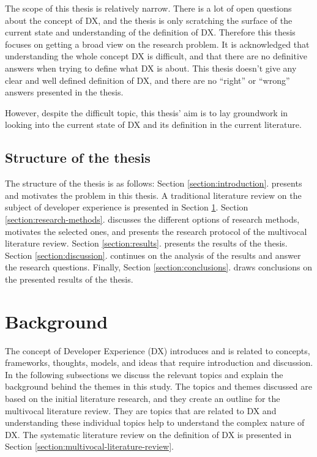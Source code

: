 \documentclass[english, 12pt, a4paper, sci, utf8, a-1b, online]{aaltothesis}
\begin{document}
The scope of this thesis is relatively narrow. There is a lot of open questions about the concept of DX, and the thesis is only scratching the surface of the current state and understanding of the definition of DX. Therefore this thesis focuses on getting a broad view on the research problem. It is acknowledged that understanding the whole concept DX is difficult, and that there are no definitive answers when trying to define what DX is about. This thesis doesn't give any clear and well defined definition of DX, and there are no ``right'' or ``wrong'' answers presented in the thesis.

However, despite the difficult topic, this thesis' aim is to lay groundwork in looking into the current state of DX and its definition in the current literature.

\subsection{Structure of the thesis}

The structure of the thesis is as follows: Section \ref{section:introduction}. presents and motivates the problem in this thesis. A traditional literature review on the subject of developer experience is presented in Section \ref{section:background}. Section \ref{section:research-methods}. discusses the different options of research methods, motivates the selected ones, and presents the research protocol of the multivocal literature review. Section \ref{section:results}. presents the results of the thesis. Section \ref{section:discussion}. continues on the analysis of the results and answer the research questions. Finally, Section \ref{section:conclusions}. draws conclusions on the presented results of the thesis.

\clearpage
\section{Background} \label{section:background}

The concept of Developer Experience (DX) introduces and is related to concepts, frameworks, thoughts, models, and ideas that require introduction and discussion. In the following subsections we discuss the relevant topics and explain the background behind the themes in this study. The topics and themes discussed are based on the initial literature research, and they create an outline for the multivocal literature review. They are topics that are related to DX and understanding these individual topics help to understand the complex nature of DX. The systematic literature review on the definition of DX is presented in Section \ref{section:multivocal-literature-review}.
\end{document}
